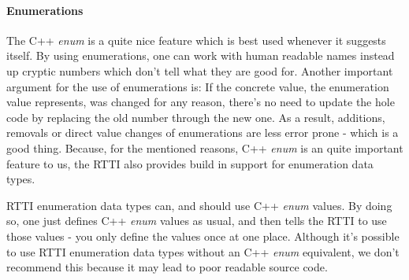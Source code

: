 \paragraph{Enumerations}
The C++ \emph{enum} is a quite nice feature which is best used whenever it suggests itself. By using enumerations, one can work with human readable names instead up cryptic numbers which don't tell what they are good for. Another important argument for the use of enumerations is: If the concrete value, the enumeration value represents, was changed for any reason, there's no need to update the hole code by replacing the old number through the new one. As a result, additions, removals or direct value changes of enumerations are less error prone - which is a good thing. Because, for the mentioned reasons, C++ \emph{enum} is an quite important feature to us, the RTTI also provides build in support for enumeration data types.

RTTI enumeration data types can, and should use C++ \emph{enum} values. By doing so, one just defines C++ \emph{enum} values as usual, and then tells the RTTI to use those values - you only define the values once at one place. Although it's possible to use RTTI enumeration data types without an C++ \emph{enum} equivalent, we don't recommend this because it may lead to poor readable source code.

